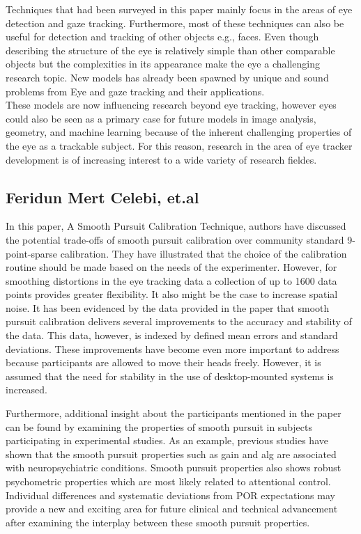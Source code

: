 Techniques that had been surveyed in this paper mainly focus in the areas of eye detection and gaze tracking. Furthermore, most of these techniques can also be useful for detection and tracking of other objects e.g., faces. Even though describing the structure of the eye is relatively simple than other comparable objects but the complexities in its appearance make the eye a challenging research topic. New models has already been spawned by unique and sound problems from Eye and gaze tracking and their applications. \\

These models are now influencing research beyond eye tracking, however eyes could also be seen as a primary case for future models in image analysis, geometry, and machine learning because of the inherent challenging properties of the eye as a trackable subject. For this reason, research in the area of eye tracker development is of increasing interest to a wide variety of research fieldes.


\subsection{Feridun Mert Celebi, et.al \cite{17}}

In this paper, A Smooth Pursuit Calibration Technique, authors have discussed the potential trade-offs of smooth pursuit calibration over community standard 9-point-sparse calibration. They have illustrated that the choice of the calibration routine should be made based on the needs of the experimenter. However, for smoothing distortions in the eye tracking data a collection of up to 1600 data points provides greater flexibility. It also might be the case to increase spatial noise. It has been evidenced by the data provided in the paper that smooth pursuit calibration delivers several improvements to the accuracy and stability of the data. This data, however, is indexed by defined mean errors and standard deviations. These improvements have become even more important to address because participants are allowed to move their heads freely. However, it is assumed that the need for stability in the use of desktop-mounted systems is increased.


Furthermore, additional insight about the participants mentioned in the paper can be found by examining the properties of smooth pursuit in subjects participating in experimental studies. As an example, previous studies have shown that the smooth pursuit properties such as gain and alg are associated with neuropsychiatric conditions. Smooth pursuit properties also shows robust psychometric properties which are most likely related to attentional control. Individual differences and systematic deviations from POR expectations may provide a new and exciting area for future clinical and technical advancement after examining the interplay between these smooth pursuit properties.



